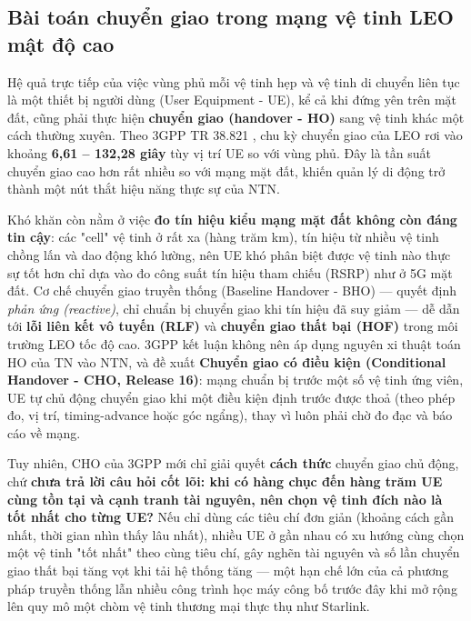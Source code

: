 \documentclass{article} %
\begin{document}
\subsection{Bài toán chuyển giao trong mạng vệ tinh LEO mật độ cao}
Hệ quả trực tiếp của việc vùng phủ mỗi vệ tinh hẹp và vệ tinh di chuyển liên tục là một thiết bị người dùng (User Equipment - UE), kể cả khi đứng yên trên mặt đất, cũng phải thực hiện \textbf{chuyển giao (handover - HO)} sang vệ tinh khác một cách thường xuyên. Theo 3GPP TR 38.821 \cite{3gpp38821}, chu kỳ chuyển giao của LEO rơi vào khoảng \textbf{6,61 -- 132,28 giây} tùy vị trí UE so với vùng phủ. Đây là tần suất chuyển giao cao hơn rất nhiều so với mạng mặt đất, khiến quản lý di động trở thành một nút thắt hiệu năng thực sự của NTN.

Khó khăn còn nằm ở việc \textbf{đo tín hiệu kiểu mạng mặt đất không còn đáng tin cậy}: các "cell" vệ tinh ở rất xa (hàng trăm km), tín hiệu từ nhiều vệ tinh chồng lấn và dao động khó lường, nên UE khó phân biệt được vệ tinh nào thực sự tốt hơn chỉ dựa vào đo công suất tín hiệu tham chiếu (RSRP) như ở 5G mặt đất. Cơ chế chuyển giao truyền thống (Baseline Handover - BHO) — quyết định \emph{phản ứng (reactive)}, chỉ chuẩn bị chuyển giao khi tín hiệu đã suy giảm — dễ dẫn tới \textbf{lỗi liên kết vô tuyến (RLF)} và \textbf{chuyển giao thất bại (HOF)} trong môi trường LEO tốc độ cao. 3GPP kết luận không nên áp dụng nguyên xi thuật toán HO của TN vào NTN, và đề xuất \textbf{Chuyển giao có điều kiện (Conditional Handover - CHO, Release 16)}: mạng chuẩn bị trước một số vệ tinh ứng viên, UE tự chủ động chuyển giao khi một điều kiện định trước được thoả (theo phép đo, vị trí, timing-advance hoặc góc ngẩng), thay vì luôn phải chờ đo đạc và báo cáo về mạng.

Tuy nhiên, CHO của 3GPP mới chỉ giải quyết \textbf{cách thức} chuyển giao chủ động, chứ \textbf{chưa trả lời câu hỏi cốt lõi: khi có hàng chục đến hàng trăm UE cùng tồn tại và cạnh tranh tài nguyên, nên chọn vệ tinh đích nào là tốt nhất cho từng UE?} Nếu chỉ dùng các tiêu chí đơn giản (khoảng cách gần nhất, thời gian nhìn thấy lâu nhất), nhiều UE ở gần nhau có xu hướng cùng chọn một vệ tinh "tốt nhất" theo cùng tiêu chí, gây nghẽn tài nguyên và số lần chuyển giao thất bại tăng vọt khi tải hệ thống tăng — một hạn chế lớn của cả phương pháp truyền thống lẫn nhiều công trình học máy công bố trước đây khi mở rộng lên quy mô một chòm vệ tinh thương mại thực thụ như Starlink.
\end{document}
